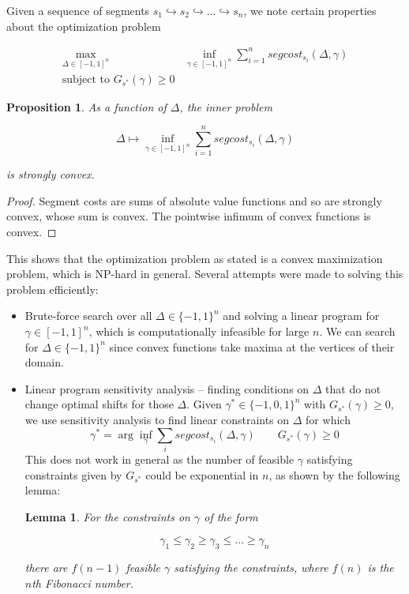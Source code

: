 \documentclass{article}
\newtheorem{proposition}{Proposition}[section]
\newtheorem{lemma}[theorem]{Lemma}
\newcommand{\1}{\langle 1 \rangle}
\newcommand{\2}{\langle 2 \rangle}
\begin{document}
Given a sequence of segments $s_1 \hookrightarrow s_2 \hookrightarrow \dots \hookrightarrow s_n$, we note certain properties about the optimization problem

\begin{align*}
    \max_{\Delta \in [-1, 1]^n} &\inf_{\gamma \in [-1, 1]^n} \sum_{i = 1}^n segcost_{s_i}(\Delta, \gamma) \\ 
    \text{subject to } G_{s^*}(\gamma) \geq 0
\end{align*}

\begin{proposition}
    As a function of $\Delta$, the inner problem

    \[\Delta \mapsto \inf_{\gamma \in [-1, 1]^n} \sum_{i = 1}^n segcost_{s_i}(\Delta, \gamma) \]

    is strongly convex.
\end{proposition}

\begin{proof}
    Segment costs are sums of absolute value functions and so are strongly convex, whose sum is convex. The pointwise infimum of convex functions is convex.
\end{proof}

This shows that the optimization problem as stated is a convex maximization problem, which is NP-hard in general. Several attempts were made to solving this problem efficiently: 

\begin{itemize}
    \item Brute-force search over all $\Delta \in \{-1, 1\}^n$ and solving a linear program for $\gamma \in [-1, 1]^n$, which is computationally infeasible for large $n$. We can search for $\Delta \in \{-1, 1\}^n$ since convex functions take maxima at the vertices of their domain.
    \item Linear program sensitivity analysis -- finding conditions on $\Delta$ that do not change optimal shifts for those $\Delta$. Given $\gamma^* \in \{-1, 0, 1\}^n$ with $G_{s^*}(\gamma) \geq 0$, we use sensitivity analysis to find linear constraints on $\Delta$ for which \[\gamma^* = \arg \inf_{\gamma} \sum_i segcost_{s_i}(\Delta, \gamma) \qquad G_{s^*}(\gamma) \geq 0\]
    This does not work in general as the number of feasible $\gamma$ satisfying constraints given by $G_{s^*}$ could be exponential in $n$, as shown by the following lemma: 

    \begin{lemma}
        For the constraints on $\gamma$ of the form 

        \[\gamma_1 \leq \gamma_2 \geq \gamma_3 \leq \dots \geq \gamma_n\]
        
        there are $f(n - 1)$ feasible $\gamma$ satisfying the constraints, where $f(n)$ is the $n$th Fibonacci number.
    \end{lemma}
\end{itemize}
\end{document}
